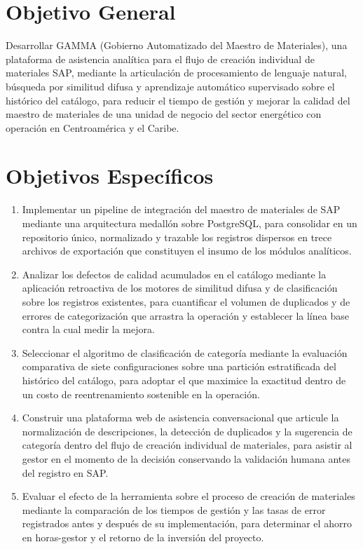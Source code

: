 \section{Objetivo General}
Desarrollar GAMMA (Gobierno Automatizado del Maestro de Materiales), una plataforma de asistencia analítica para el flujo de creación individual de materiales SAP, mediante la articulación de procesamiento de lenguaje natural, búsqueda por similitud difusa y aprendizaje automático supervisado sobre el histórico del catálogo, para reducir el tiempo de gestión y mejorar la calidad del maestro de materiales de una unidad de negocio del sector energético con operación en Centroamérica y el Caribe.

\section{Objetivos Específicos}
\begin{enumerate}
	\item Implementar un pipeline de integración del maestro de materiales de SAP mediante una arquitectura medallón sobre PostgreSQL, para consolidar en un repositorio único, normalizado y trazable los registros dispersos en trece archivos de exportación que constituyen el insumo de los módulos analíticos.

	\item Analizar los defectos de calidad acumulados en el catálogo mediante la aplicación retroactiva de los motores de similitud difusa y de clasificación sobre los registros existentes, para cuantificar el volumen de duplicados y de errores de categorización que arrastra la operación y establecer la línea base contra la cual medir la mejora.

	\item Seleccionar el algoritmo de clasificación de categoría mediante la evaluación comparativa de siete configuraciones sobre una partición estratificada del histórico del catálogo, para adoptar el que maximice la exactitud dentro de un costo de reentrenamiento sostenible en la operación.

	\item Construir una plataforma web de asistencia conversacional que articule la normalización de descripciones, la detección de duplicados y la sugerencia de categoría dentro del flujo de creación individual de materiales, para asistir al gestor en el momento de la decisión conservando la validación humana antes del registro en SAP.

	\item Evaluar el efecto de la herramienta sobre el proceso de creación de materiales mediante la comparación de los tiempos de gestión y las tasas de error registrados antes y después de su implementación, para determinar el ahorro en horas-gestor y el retorno de la inversión del proyecto.
\end{enumerate}
